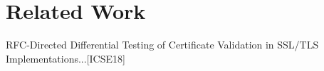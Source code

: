 \documentclass[10pt,conference,anonymous]{IEEEtran}
\begin{document}
\section{Related Work}

RFC-Directed Differential Testing of Certificate Validation in SSL/TLS Implementations...[ICSE18]


%


\end{document}
